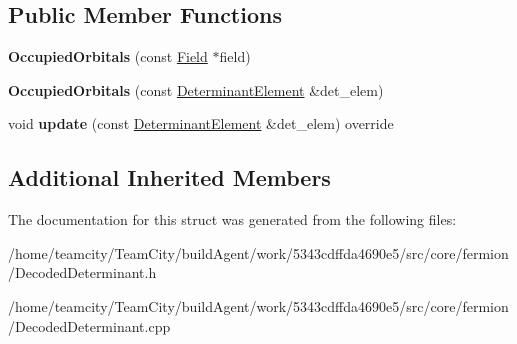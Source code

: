 \subsection*{Public Member Functions}
\begin{DoxyCompactItemize}
\item 
{\bfseries Occupied\+Orbitals} (const \hyperlink{classField}{Field} $\ast$field)\hypertarget{structOccupiedOrbitals_a32b0dfc718c1beff3dfde8aafff43ad4}{}\label{structOccupiedOrbitals_a32b0dfc718c1beff3dfde8aafff43ad4}

\item 
{\bfseries Occupied\+Orbitals} (const \hyperlink{classDeterminantElement}{Determinant\+Element} \&det\+\_\+elem)\hypertarget{structOccupiedOrbitals_af7c41020b9a89ed15d37cee234cb4a49}{}\label{structOccupiedOrbitals_af7c41020b9a89ed15d37cee234cb4a49}

\item 
void {\bfseries update} (const \hyperlink{classDeterminantElement}{Determinant\+Element} \&det\+\_\+elem) override\hypertarget{structOccupiedOrbitals_a01a8a2b198323392cf39758d68dbfd6e}{}\label{structOccupiedOrbitals_a01a8a2b198323392cf39758d68dbfd6e}

\end{DoxyCompactItemize}
\subsection*{Additional Inherited Members}


The documentation for this struct was generated from the following files\+:\begin{DoxyCompactItemize}
\item 
/home/teamcity/\+Team\+City/build\+Agent/work/5343cdffda4690e5/src/core/fermion/Decoded\+Determinant.\+h\item 
/home/teamcity/\+Team\+City/build\+Agent/work/5343cdffda4690e5/src/core/fermion/Decoded\+Determinant.\+cpp\end{DoxyCompactItemize}

